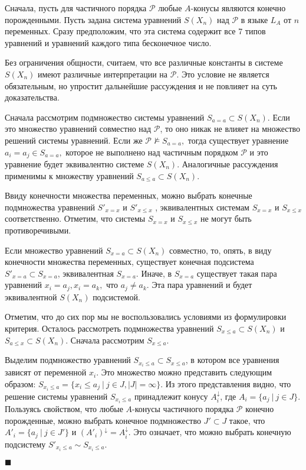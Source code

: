 \documentclass[12pt]{article}
\theoremstyle{break}
\newenvironment{Proof} %
	{\par\noindent{\bf Доказательство.}} %
	{\hfill$\scriptstyle\blacksquare$} %
\def\P{\mathcal{P}}
\begin{document}
		\begin{Proof}
			Сначала, пусть для частичного порядка $\P$ любые $A$-конусы являются конечно порожденными. Пусть задана система уравнений $S(X_n)$ над $\P$ в языке $L_A$ от $n$ переменных. Сразу предположим, что эта система содержит все 7 типов уравнений и уравнений каждого типа бесконечное число.

			Без ограничения общности, считаем, что все различные константы в системе $S(X_n)$ имеют различные интерпретации на $\P$. Это условие не является обязательным, но упростит дальнейшие рассуждения и не повлияет на суть доказательства.

			Сначала рассмотрим подмножество системы уравнений $S_{a=a}\subset S(X_n)$. Если это множество уравнений совместно над $\P$, то оно никак не влияет на множество решений системы уравнений. Если же $\P\nvDash S_{a=a},$ тогда существует уравнение $a_i=a_j\in S_{a=a},$ которое не выполнено над частичным порядком $\P$ и это уравнение будет эквивалентно системе $S(X_n).$ Аналогичные рассуждения применимы к множеству уравнений $S_{a\leqslant a}\subset S(X_n).$

			Ввиду конечности множества переменных, можно выбрать конечные подмножества уравнений $S'_{x=x}$ и $S'_{x\leqslant x}$ , эквивалентных системам $S_{x=x}$ и $S_{x\leqslant x}$ соответственно. Отметим, что системы $S_{x=x}$ и $S_{x\leqslant x}$ не могут быть противоречивыми.

			Если множество уравнений $S_{x=a}\subset S(X_n)$ совместно, то, опять, в виду конечности множества переменных, существует конечная подсистема $S'_{x=a}\subset S_{x=a}$, эквивалентная $S_{x=a}.$ Иначе, в $S_{x=a}$  существует такая пара уравнений $x_i=a_j, x_i=a_k,$ что $a_j\neq a_k$. Эта пара уравнений и будет эквивалентной $S(X_n)$ подсистемой.

			Отметим, что до сих пор мы не воспользовались условиями из формулировки критерия. Осталось рассмотреть подмножества уравнений $S_{x\leqslant a}\subset S(X_n)$ и $S_{a\leqslant x}\subset S(X_n)$. Сначала рассмотрим $S_{x\leqslant a}$.

			Выделим подмножество уравнений $S_{x_i\leqslant a}\subset S_{x\leqslant a}$, в котором все уравнения зависят от переменной $x_i$. Это множество можно представить следующим образом: $S_{x_i\leqslant a}=\{x_i\leqslant a_j\ |\ j\in J, |J| = \infty\}.$ Из этого представления видно, что решение системы уравнений $S_{x_i\leqslant a}$ принадлежит конусу $A_i^{\downarrow}$, где $A_i = \{a_j\ |\ j\in J\}$. Пользуясь свойством, что любые $A$-конусы частичного порядка $\P$ конечно порожденные, можно выбрать конечное подмножество $J'\subset J$ такое, что $A'_i = \{a_j\ |\ j\in J'\}$ и $(A'_i)^{\downarrow} = A_i^{\downarrow}.$ Это означает, что можно выбрать конечную подсистему $S'_{x_i\leqslant a}\sim S_{x_i\leqslant a}$.


\end{Proof}
\end{document}
